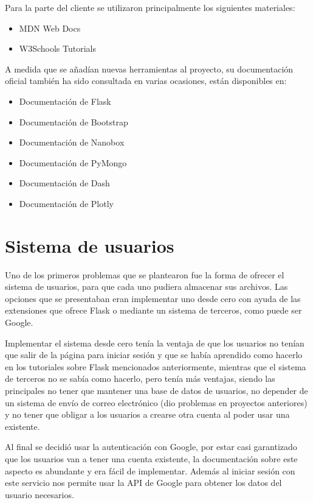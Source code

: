 \noindent Para la parte del cliente se utilizaron principalmente los siguientes
materiales:
\begin{itemize}
	\item MDN Web Docs\cite{mdn}
	\item W3Schools Tutorials\cite{w3schools}
\end{itemize}

A medida que se añadían nuevas herramientas al proyecto, su documentación
oficial también ha sido consultada en varias ocasiones, están disponibles en:
\begin{itemize}
	\item Documentación de Flask\cite{doc:flask}
	\item Documentación de Bootstrap\cite{doc:bootstrap}
	\item Documentación de Nanobox\cite{doc:nanobox}
	\item Documentación de PyMongo\cite{doc:pymongo}
	\item Documentación de Dash\cite{doc:dash}
	\item Documentación de Plotly\cite{doc:plotly}
\end{itemize}

\section{Sistema de usuarios}

Uno de los primeros problemas que se plantearon fue la forma de ofrecer el
sistema de usuarios, para que cada uno pudiera almacenar sus archivos. Las
opciones que se presentaban eran implementar uno desde cero con ayuda de las
extensiones que ofrece Flask o mediante un sistema de terceros, como puede ser
Google.

Implementar el sistema desde cero tenía la ventaja de que los usuarios no tenían
que salir de la página para iniciar sesión y que se había aprendido como hacerlo
en los tutoriales sobre Flask mencionados anteriormente, mientras que el sistema
de terceros no se sabía como hacerlo, pero tenía más ventajas, siendo las
principales no tener que mantener una base de datos de usuarios, no depender de
un sistema de envío de correo electrónico (dio problemas en proyectos
anteriores) y no tener que obligar a los usuarios a crearse otra cuenta al poder
usar una existente.

Al final se decidió usar la autenticación con Google, por estar casi garantizado
que los usuarios van a tener una cuenta existente, la documentación sobre este
aspecto es abundante y era fácil de implementar. Además al iniciar sesión con
este servicio nos permite usar la API de Google para obtener los datos del
usuario necesarios.

